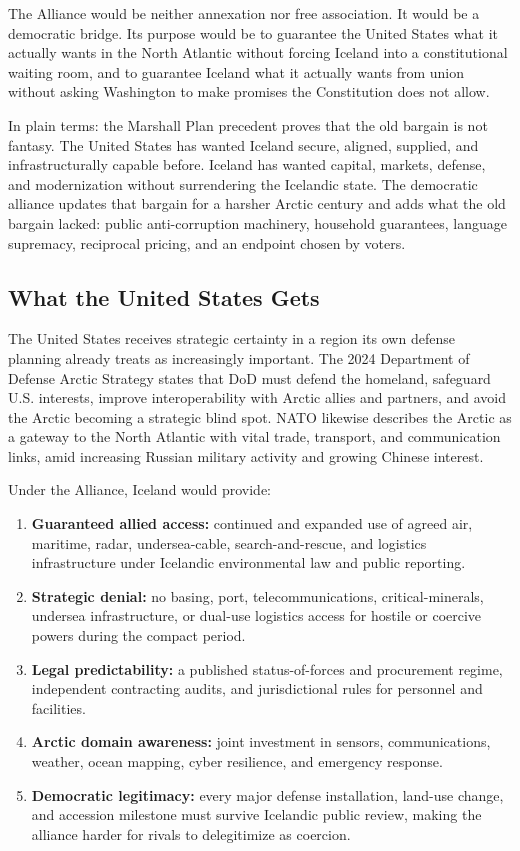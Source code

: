 \documentclass[11pt,a4paper]{article}
\begin{document}
The Alliance would be neither annexation nor free association. It would be a democratic bridge. Its purpose would be to guarantee the United States what it actually wants in the North Atlantic without forcing Iceland into a constitutional waiting room, and to guarantee Iceland what it actually wants from union without asking Washington to make promises the Constitution does not allow.

In plain terms: the Marshall Plan precedent proves that the old bargain is not fantasy. The United States has wanted Iceland secure, aligned, supplied, and infrastructurally capable before. Iceland has wanted capital, markets, defense, and modernization without surrendering the Icelandic state. The democratic alliance updates that bargain for a harsher Arctic century and adds what the old bargain lacked: public anti-corruption machinery, household guarantees, language supremacy, reciprocal pricing, and an endpoint chosen by voters.

\subsection{What the United States Gets}
The United States receives strategic certainty in a region its own defense planning already treats as increasingly important. The 2024 Department of Defense Arctic Strategy states that DoD must defend the homeland, safeguard U.S. interests, improve interoperability with Arctic allies and partners, and avoid the Arctic becoming a strategic blind spot.\cite{dodarctic} NATO likewise describes the Arctic as a gateway to the North Atlantic with vital trade, transport, and communication links, amid increasing Russian military activity and growing Chinese interest.\cite{natoarctic}

Under the Alliance, Iceland would provide:

\begin{enumerate}
  \item \textbf{Guaranteed allied access:} continued and expanded use of agreed air, maritime, radar, undersea-cable, search-and-rescue, and logistics infrastructure under Icelandic environmental law and public reporting.
  \item \textbf{Strategic denial:} no basing, port, telecommunications, critical-minerals, undersea infrastructure, or dual-use logistics access for hostile or coercive powers during the compact period.
  \item \textbf{Legal predictability:} a published status-of-forces and procurement regime, independent contracting audits, and jurisdictional rules for personnel and facilities.
  \item \textbf{Arctic domain awareness:} joint investment in sensors, communications, weather, ocean mapping, cyber resilience, and emergency response.
  \item \textbf{Democratic legitimacy:} every major defense installation, land-use change, and accession milestone must survive Icelandic public review, making the alliance harder for rivals to delegitimize as coercion.
\end{enumerate}
\end{document}
